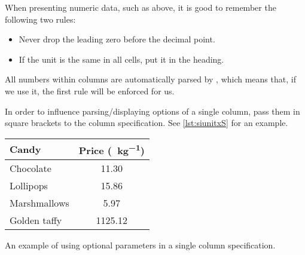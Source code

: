 When presenting numeric data, such as above, it is good to remember the
following two rules:
\begin{itemize}
  \item Never drop the leading zero before the decimal point.
  \item If the unit is the same in all cells, put it in the heading.
\end{itemize}
All numbers within  columns are automatically parsed by ,
which means that, if we use it, the first rule will be enforced for us.

In order to influence parsing\slash{}displaying options of a
single column, pass them in square brackets to the column specification. See
\autoref{lst:siunitxS} for an example.
\begin{listing}
  \begin{example}[examplewidth=0.8\linewidth, vertical_mode]
\DeclareSIUnit{\eur}{\euro}
\begin{tabular} {
    @{}l
    S[output-decimal-marker={,},
      per-mode=symbol]@{}
  }
  \toprule
  Candy        & {Price (\unit{\eur\per\kg})} \\
  \midrule
  Chocolate    & 11.30                        \\
  Lollipops    & 15.86                        \\
  Marshmallows & 5.97                         \\
  Golden taffy & 1125.12                      \\
  \bottomrule
\end{tabular}
\end{example}
  \caption{An example of using optional parameters in a single 
    column specification.}\label{lst:siunitxS}
\end{listing}

